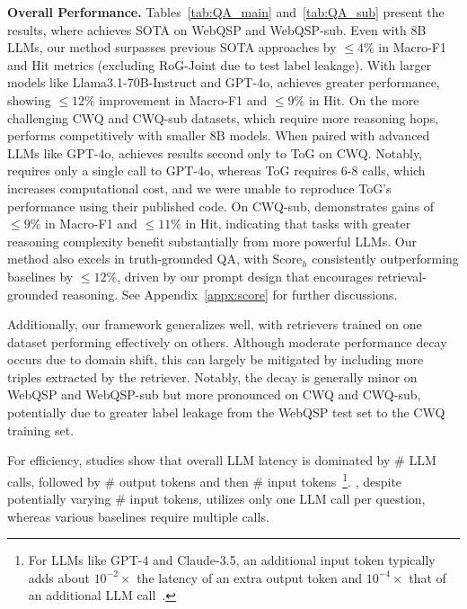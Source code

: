 \textbf{Overall Performance.} Tables~\ref{tab:QA_main} and~\ref{tab:QA_sub} present the results, where \proj achieves SOTA on WebQSP and WebQSP-sub. Even with 8B LLMs, our method surpasses previous SOTA approaches by $\leq 4\%$ in Macro-F1 and Hit metrics (excluding RoG-Joint due to test label leakage). With larger models like Llama3.1-70B-Instruct and GPT-4o, \proj achieves greater performance, showing $\leq 12\%$ improvement in Macro-F1 and $\leq 9\%$ in Hit.
On the more challenging CWQ and CWQ-sub datasets, which require more reasoning hops, \proj performs competitively with smaller 8B models. When paired with advanced LLMs like GPT-4o, \proj achieves results second only to ToG on CWQ. Notably, \proj requires only a single call to GPT-4o, whereas ToG requires 6-8 calls, which increases computational cost, and we were unable to reproduce ToG's performance using their published code. On CWQ-sub, \proj demonstrates gains of $\leq 9\%$ in Macro-F1 and $\leq 11\%$ in Hit, indicating that tasks with greater reasoning complexity benefit substantially from more powerful LLMs. Our method also excels in truth-grounded QA, with Score$_h$ consistently outperforming baselines by $\leq 12\%$, driven by our prompt design that encourages retrieval-grounded reasoning. See Appendix~\ref{appx:score} for further discussions.

Additionally, our framework generalizes well, with retrievers trained on one dataset performing effectively on others. Although moderate performance decay occurs due to domain shift, this can largely be mitigated by including more triples extracted by the retriever. Notably, the decay is generally minor on WebQSP and WebQSP-sub but more pronounced on CWQ and CWQ-sub, potentially due to greater label leakage from the WebQSP test set to the CWQ training set.

For efficiency, studies show that overall LLM latency is dominated by $\#$ LLM calls, followed by $\#$ output tokens and then $\#$ input tokens~\footnote{For LLMs like GPT-4 and Claude-3.5, an additional input token typically adds about $10^{-2}\times$ the latency of an extra output token and $10^{-4}\times$ that of an additional LLM call~\citep{vivek2024input}.}. \proj, despite potentially varying $\#$ input tokens, utilizes only one LLM call per question, whereas various baselines require multiple calls.

